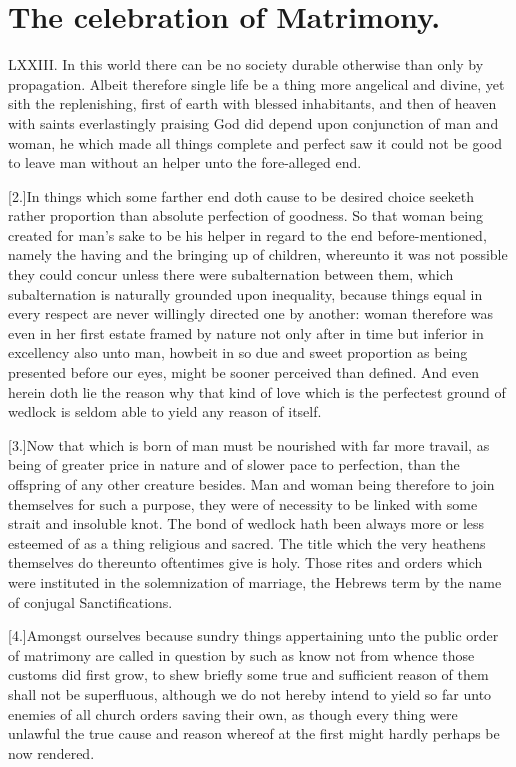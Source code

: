\section*{The celebration of Matrimony.}
LXXIII. In this world there can be no society durable otherwise than only by propagation. Albeit therefore single life be a thing more angelical and divine, yet sith the replenishing, first of earth with blessed inhabitants, and then of heaven with saints everlastingly praising God did depend upon conjunction of man and woman, he which made all things complete and perfect saw it could not be good to leave man without an helper unto the fore-alleged end.

[2.]In things which some farther end doth cause to be desired choice seeketh rather proportion than absolute perfection of goodness. So that woman being created for man’s sake to be his helper in regard to the end before-mentioned, namely the having and the bringing up of children, whereunto it was not possible they could concur unless there were subalternation between them, which subalternation is naturally grounded upon inequality, because things equal in every respect are never willingly directed one by another: woman therefore was even in her first estate framed by nature not only after in time but inferior in excellency also unto man, howbeit in so due and sweet proportion as being presented before our eyes, might be sooner perceived than defined. And even herein doth lie the reason why that kind of love which is the perfectest ground of wedlock is seldom able to yield any reason of itself.

[3.]Now that which is born of man must be nourished with far more travail, as being of greater price in nature and of slower pace to perfection, than the offspring of any other creature besides. Man and woman being therefore to join themselves for such a purpose, they were of necessity to be linked with some strait and insoluble knot. The bond of wedlock hath been always more or less esteemed of as a thing religious and sacred. The title which the very heathens  themselves do thereunto oftentimes give is holy.
 Those rites and orders which were instituted in the solemnization of marriage, the Hebrews term by the name of conjugal Sanctifications.

[4.]Amongst ourselves because sundry things appertaining unto the public order of matrimony are called in question by such as know not from whence those customs did first grow, to shew briefly some true and sufficient reason of them shall not be superfluous, although we do not hereby intend to yield so far unto enemies of all church orders saving their own, as though every thing were unlawful the true cause and reason whereof at the first might hardly perhaps be now rendered.

